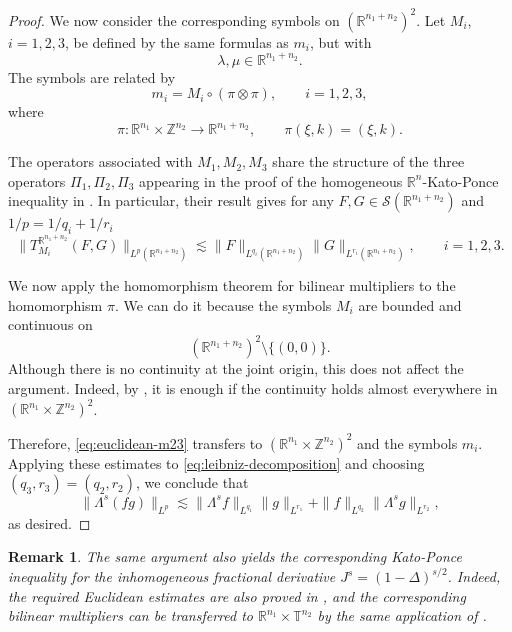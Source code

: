 \documentclass[11pt,a4paper]{article}
\newcommand{\R}{\mathbb{R}}
\newtheorem{rem}[thm]{Remark}
\begin{document}
\begin{proof}
We now consider the corresponding symbols on $(\mathbb{R}^{n_1+n_2})^2$.
Let $M_i$, $i=1,2,3$, be defined by the same formulas as
$m_i$, but with
$$
\lambda,\mu\in\mathbb{R}^{n_1+n_2}.
$$
The symbols are related by
$$
m_i=M_i\circ(\pi\otimes\pi),
\qquad i=1,2,3,
$$
where
$$
\pi:\mathbb{R}^{n_1}\times\mathbb{Z}^{n_2}\longrightarrow\mathbb{R}^{n_1+n_2},
\qquad
\pi(\xi,k)=(\xi,k).
$$

The operators associated with $M_1,M_2,M_3$ share the structure of the three
operators $\Pi_1,\Pi_2,\Pi_3$ appearing in the proof of the
homogeneous $\R^n$-Kato-Ponce inequality in
\cite[Section~3, proof of Theorem~1]{GrafakosOh2014}.
In particular, their result gives for any $F,G\in\mathscr{S}(\R^{n_1+n_2})$ and $1/p=1/q_i+1/r_i$
\begin{equation}
\label{eq:euclidean-m23}
\|T_{M_i}^{\mathbb{R}^{n_1+n_2}}(F,G)\|_{L^p(\mathbb{R}^{n_1+n_2})}
\lesssim
\|F\|_{L^{q_i}(\mathbb{R}^{n_1+n_2})}
\|G\|_{L^{r_i}(\mathbb{R}^{n_1+n_2})},
\qquad i=1,2,3.
\end{equation}

We now apply the homomorphism theorem for bilinear multipliers \cite[Theorem~2.2 (i)]{RodriguezLopez2013} to the homomorphism $\pi$.
We can do it because the symbols $M_i$ are bounded and continuous on
\[
(\mathbb{R}^{n_1+n_2})^2\setminus\{(0,0)\}.
\]
Although there is no continuity at the joint origin, this does
not affect the argument. Indeed, by
\cite[Observation 3]{RodriguezLopez2013}, it is enough if the
continuity holds almost everywhere in $(\mathbb{R}^{n_1}\times\mathbb{Z}^{n_2})^2$.

Therefore,
\eqref{eq:euclidean-m23} transfers to
$(\mathbb{R}^{n_1}\times\mathbb{Z}^{n_2})^2$ and the symbols $m_i$.
Applying these estimates to
\eqref{eq:leibniz-decomposition} and choosing $(q_3,r_3)=(q_2,r_2)$, we conclude that
\[
\|\Lambda^s(fg)\|_{L^p}
\lesssim
\|\Lambda^s f\|_{L^{q_1}}\|g\|_{L^{r_1}}
+
\|f\|_{L^{q_2}}\|\Lambda^s g\|_{L^{r_2}},
\]
as desired.
\end{proof}

\begin{rem}
The same argument also yields the corresponding Kato-Ponce
inequality for the inhomogeneous fractional derivative
$J^s=(1-\Delta)^{s/2}$. Indeed, the required Euclidean estimates
are also proved in \cite{GrafakosOh2014}, and the corresponding
bilinear multipliers can be transferred to
$\mathbb{R}^{n_1}\times\mathbb{T}^{n_2}$ by the same application of
\cite[Theorem~2.2]{RodriguezLopez2013}.
\end{rem}
\end{document}
